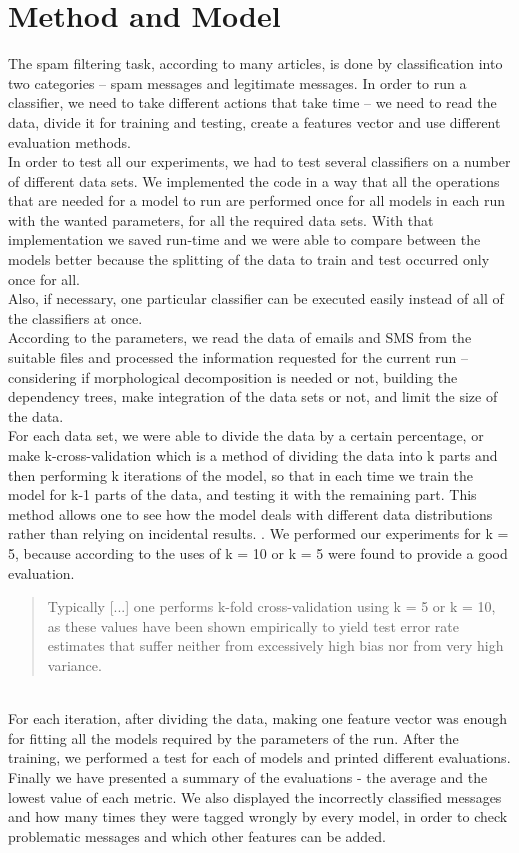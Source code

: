 \documentclass[11pt,a4paper]{article}
\begin{document}
\section{Method and Model}
The spam filtering task, according to many articles, is done by classification into two categories – spam messages and legitimate messages. In order to run a classifier, we need to take different actions that take time – we need to read the data, divide it for training and testing, create a features vector and use different evaluation methods.\\
In order to test all our experiments, we had to test several classifiers on a number of different data sets. We implemented the code in a way that all the operations that are needed for a model to run are performed once for all models in each run with the wanted parameters, for all the required data sets. With that implementation we saved run-time and we were able to compare between the models better because the splitting of the data to train and test occurred only once for all.\\
Also, if necessary, one particular classifier can be executed easily instead of all of the classifiers at once.\\
According to the parameters, we read the data of emails and SMS from the suitable files and processed the information requested for the current run – considering if morphological decomposition is needed or not, building the dependency trees, make integration of the data sets or not, and limit the size of the data.\\
For each data set, we were able to divide the data by a certain percentage, or make k-cross-validation which is a method of dividing the data into k parts and then performing k iterations of the model, so that in each time we train the model for k-1 parts of the data, and testing it with the remaining part. This method allows one to see how the model deals with different data distributions rather than relying on incidental results. . We performed our experiments for k = 5, because according to \citep{lnk3} the uses of k = 10 or k = 5 were found to provide a good evaluation.
\begin{quote}
Typically [...] one performs k-fold cross-validation using k = 5 or k = 10, as these values have been shown empirically to yield test error rate estimates that suffer neither from excessively high bias nor from very high variance.
\end{quote}\\
For each iteration, after dividing the data, making one feature vector was enough for fitting all the models required by the parameters of the run. After the training, we performed a test for each of models and printed different evaluations. Finally we have presented a summary of the evaluations - the average and the lowest value of each metric. We also displayed the incorrectly classified messages and how many times they were tagged wrongly by every model, in order to check problematic messages and which other features can be added.\\
\end{document}
